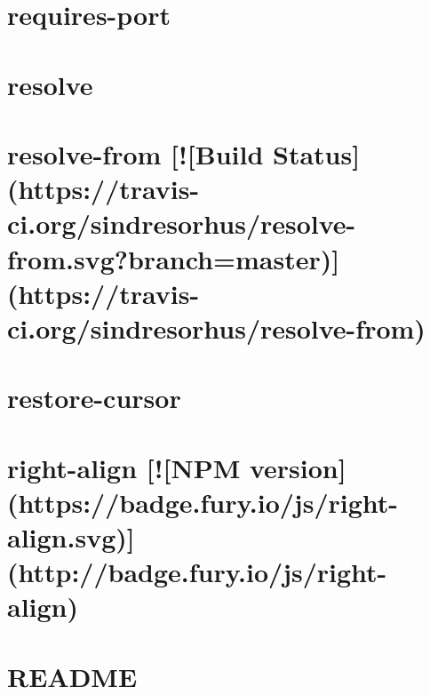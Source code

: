\documentclass[twoside]{book}
\newcommand{\+}{\discretionary{\mbox{\scriptsize$\hookleftarrow$}}{}{}}
\begin{document}
\chapter{requires-\/port}
\label{md__c_1_workspace_demo_src_main_script_node_modules_requires-port__r_e_a_d_m_e}

\chapter{resolve}
\label{md__c_1_workspace_demo_src_main_script_node_modules_resolve_readme}

\chapter{resolve-\/from \mbox{[}!\mbox{[}Build Status\mbox{]}(https\+://travis-\/ci.org/sindresorhus/resolve-\/from.svg?branch=master)\mbox{]}(https\+://travis-\/ci.org/sindresorhus/resolve-\/from)}
\label{md__c_1_workspace_demo_src_main_script_node_modules_resolve-from_readme}

\chapter{restore-\/cursor}
\label{md__c_1_workspace_demo_src_main_script_node_modules_restore-cursor_readme}

\chapter{right-\/align \mbox{[}!\mbox{[}N\+PM version\mbox{]}(https\+://badge.fury.\+io/js/right-\/align.svg)\mbox{]}(http\+://badge.fury.\+io/js/right-\/align)}
\label{md__c_1_workspace_demo_src_main_script_node_modules_right-align__r_e_a_d_m_e}

\chapter{R\+E\+A\+D\+ME}
\label{md__c_1_workspace_demo_src_main_script_node_modules_rimraf__r_e_a_d_m_e}

\end{document}

